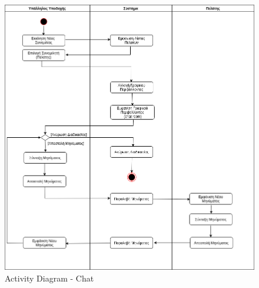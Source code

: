 \begin{figure}[H]
	\centering
	\includegraphics[width=1\textwidth]{Images/Activity-Chat}
	\caption{Activity Diagram - Chat}
	\label{Activity - Chat}
\end{figure}
\clearpage

